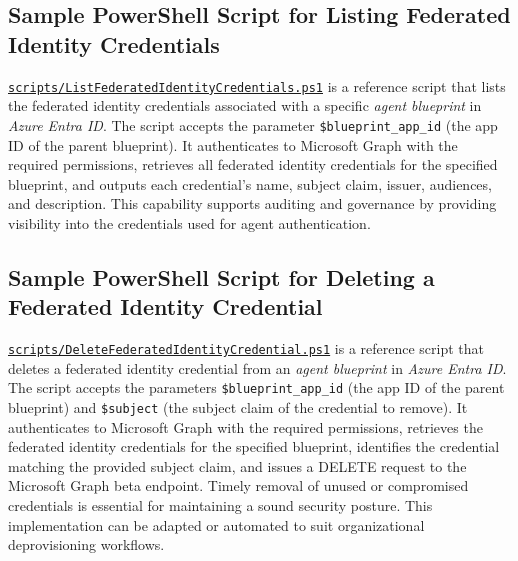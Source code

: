 \documentclass[9pt]{extarticle}%
\begin{document}
\subsection{Sample PowerShell Script for Listing Federated Identity Credentials}%
\href{https://github.com/dennisseah/agent-identity/blob/main/scripts/ListFederatedIdentityCredentials.ps1}{\texttt{scripts/ListFederatedIdentityCredentials.ps1}} is a reference script that lists the federated identity credentials associated with a specific \textit{agent blueprint} in \textit{Azure Entra ID}. The script accepts the parameter \texttt{\$blueprint\_app\_id} (the app ID of the parent blueprint). It authenticates to Microsoft Graph with the required permissions, retrieves all federated identity credentials for the specified blueprint, and outputs each credential's name, subject claim, issuer, audiences, and description. This capability supports auditing and governance by providing visibility into the credentials used for agent authentication.
%
\par\vspace{\baselineskip}%
\subsection{Sample PowerShell Script for Deleting a Federated Identity Credential}%
\href{https://github.com/dennisseah/agent-identity/blob/main/scripts/DeleteFederatedIdentityCredential.ps1}{\texttt{scripts/DeleteFederatedIdentityCredential.ps1}} is a reference script that deletes a federated identity credential from an \textit{agent blueprint} in \textit{Azure Entra ID}. The script accepts the parameters \texttt{\$blueprint\_app\_id} (the app ID of the parent blueprint) and \texttt{\$subject} (the subject claim of the credential to remove). It authenticates to Microsoft Graph with the required permissions, retrieves the federated identity credentials for the specified blueprint, identifies the credential matching the provided subject claim, and issues a DELETE request to the Microsoft Graph beta endpoint. Timely removal of unused or compromised credentials is essential for maintaining a sound security posture. This implementation can be adapted or automated to suit organizational deprovisioning workflows.
%
\par\vspace{\baselineskip}%
\end{document}
